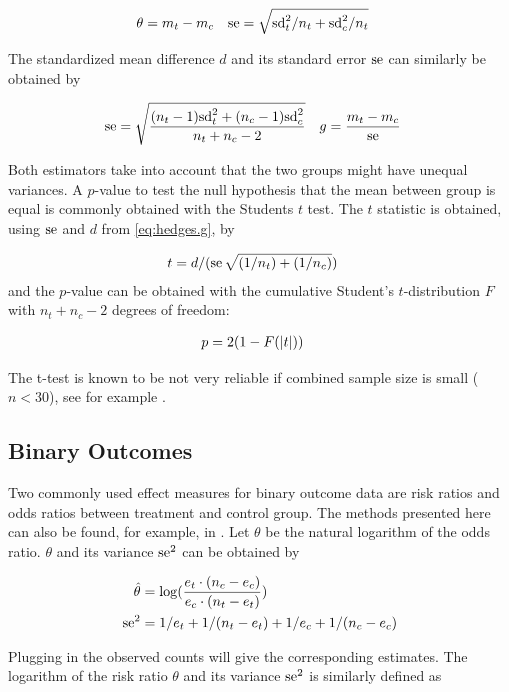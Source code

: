 \documentclass[11pt,a4paper,twoside]{book}\usepackage[]{graphicx}\usepackage[]{color}
\begin{document}
\begin{align}
\theta &= m_t - m_c & \operatorname{se} &= \sqrt{\textrm{sd}_t^2/n_t + \textrm{sd}_c^2/n_t}
\end{align}

The standardized mean difference $d$ and its standard error $\operatorname{se}$ can similarly be obtained by

\begin{align}
\operatorname{se} &= \sqrt{\frac{(n_t - 1)\textrm{sd}_t^2 + (n_c - 1)\textrm{sd}_c^2}{n_t + n_c - 2}} & g &= \frac{m_t - m_c}{\operatorname{se}} \label{eq:hedges.g}
\end{align}

Both estimators take into account that the two groups might have unequal variances. A $p$-value to test the null hypothesis that the mean between group is equal is commonly obtained with the Students $t$ test. The $t$ statistic is obtained, using $\operatorname{se}$ and $d$ from \eqref{eq:hedges.g}, by

\begin{align}
t &= d/(\operatorname{se}\sqrt{(1/n_t)+(1/n_c)}) \nonumber
\end{align}
and the $p$-value can be obtained with the cumulative Student's $t$-distribution $F$ with $n_t + n_c - 2$ degrees of freedom:

\begin{align}
p &= 2(1-F(\left\lvert t\right\rvert)) \nonumber
\end{align}

The t-test is known to be not very reliable if combined sample size is small ($n < 30$), see for example \citet{t.test}.

\subsection{Binary Outcomes}
Two commonly used effect measures for binary outcome data are risk ratios and odds ratios between treatment and control group. 
The methods presented here can also be found, for example, in \cite[34]{Intro.meta}.
Let $\theta$ be the natural logarithm of the odds ratio. $\theta$ and its variance $\operatorname{se}^2$ can be obtained by 

\begin{align}
\hat{\theta} &= \log(\frac{e_t\cdot(n_c - e_c)}{e_c\cdot(n_t - e_t)}) \nonumber \\
\operatorname{se}^2 &= 1/e_t + 1/(n_t - e_t) + 1/e_c + 1/(n_c - e_c) \nonumber
\end{align}

Plugging in the observed counts will give the corresponding estimates. The logarithm of the risk ratio $\theta$ and its variance $\operatorname{se}^2$ is similarly defined as
\end{document}

